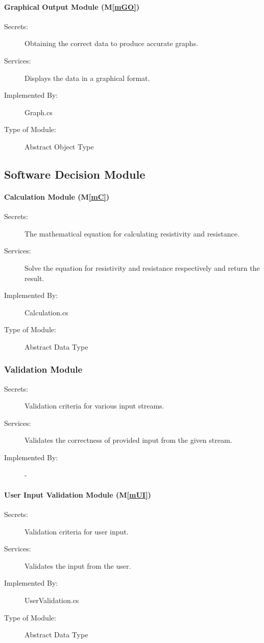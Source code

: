 \documentclass[12pt, titlepage]{article}
\newcommand{\mref}[1]{M\ref{#1}}
\begin{document}
\paragraph{Graphical Output Module (\mref{mGO})}
\begin{description}
\item[Secrets:]Obtaining the correct data to produce accurate graphs.
\item[Services:]Displays the data in a graphical format. 
\item[Implemented By:] Graph.cs
\item[Type of Module:] Abstract Object Type
\end{description}

\subsection{Software Decision Module}

\paragraph{Calculation Module (\mref{mC})}
\begin{description}
  \item[Secrets:] The mathematical equation for calculating resistivity and resistance.
  \item[Services:]Solve the equation for resistivity and resistance respectively and return the result.
  \item[Implemented By:] Calculation.cs 
  \item[Type of Module:] Abstract Data Type
\end{description}

\subsubsection{Validation Module}
\begin{description}
  \item[Secrets:] Validation criteria for various input streams.
  \item[Services:]Validates the correctness of provided input from the given stream.
  \item[Implemented By:] -
\end{description}

\paragraph{User Input Validation Module (\mref{mUI})}
\begin{description}
  \item[Secrets:] Validation criteria for user input.
  \item[Services:] Validates the input from the user.
  \item[Implemented By:] UserValidation.cs 
  \item[Type of Module:] Abstract Data Type
\end{description}
\end{document}
